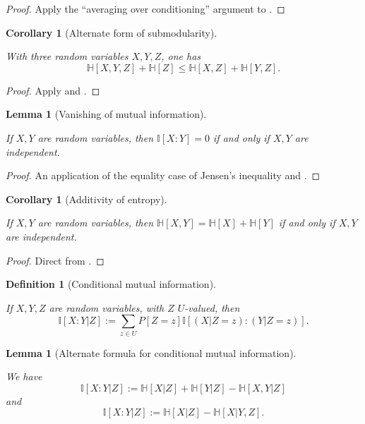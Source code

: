 \documentclass[10pt,a4paper]{article}
\newtheorem{lemma}[theorem]{Lemma}
\newtheorem{corollary}[theorem]{Corollary}
\newtheorem{definition}[theorem]{Definition}
\newcommand{\lean}[1]{}
\newcommand{\uses}[1]{}
\newcommand{\leanok}{}
\newcommand{\bbH}{\mathbb{H}}
\newcommand{\bbI}{\mathbb{I}}
\begin{document}
\begin{proof} \uses{cond-reduce}\leanok Apply the ``averaging over conditioning'' argument to .
\end{proof}

\begin{corollary}[Alternate form of submodularity]\label{alt-submodularity}
  \lean{ProbabilityTheory.entropy_triple_add_entropy_le}\leanok
  With three random variables $X,Y,Z$, one has
  $$ \bbH[X,Y,Z] + \bbH[Z] \leq \bbH[X,Z] + \bbH[Y,Z].$$
\end{corollary}

\begin{proof}  \uses{submodularity,chain-rule} \leanok Apply  and .
\end{proof}


\begin{lemma}[Vanishing of mutual information]
  \label{vanish-entropy}
  \uses{information-def, independent-def}
  \lean{ProbabilityTheory.mutualInfo_eq_zero}
  \leanok
  If $X,Y$ are random variables, then $\bbI[X:Y] = 0$ if and only if $X,Y$ are independent.
  \end{lemma}

  \begin{proof}
    \uses{concave}
    \leanok

    An application of the equality case of Jensen's inequality and .
  \end{proof}

\begin{corollary}[Additivity of entropy]\label{add-entropy}
  \lean{ProbabilityTheory.entropy_pair_eq_add}
  \leanok
  If $X,Y$ are random variables, then $\bbH[X,Y] = \bbH[X] + \bbH[Y]$ if and only if $X,Y$ are independent.
\end{corollary}

\begin{proof} \uses{vanish-entropy}\leanok
  Direct from .
\end{proof}

\begin{definition}[Conditional mutual information]
\label{conditional-mutual-def}
\uses{information-def,condition-event-def}
\lean{ProbabilityTheory.condMutualInfo}
\leanok
If $X,Y,Z$ are random variables, with $Z$ $U$-valued, then
$$ \bbI[X:Y|Z] := \sum_{z \in U} P[Z=z] \bbI[(X|Z=z): (Y|Z=z)].$$
\end{definition}

\begin{lemma}[Alternate formula for conditional mutual information]
  \label{conditional-mutual-alt}
  \uses{conditional-mutual-def}
  \lean{ProbabilityTheory.condMutualInfo_eq, ProbabilityTheory.condMutualInfo_eq'}\leanok
We have
  $$ \bbI[X:Y|Z] := \bbH[X|Z] + \bbH[Y|Z] - \bbH[X,Y|Z]$$
and
  $$ \bbI[X:Y|Z] := \bbH[X|Z] - \bbH[X|Y,Z].$$
\end{lemma}
\end{document}
